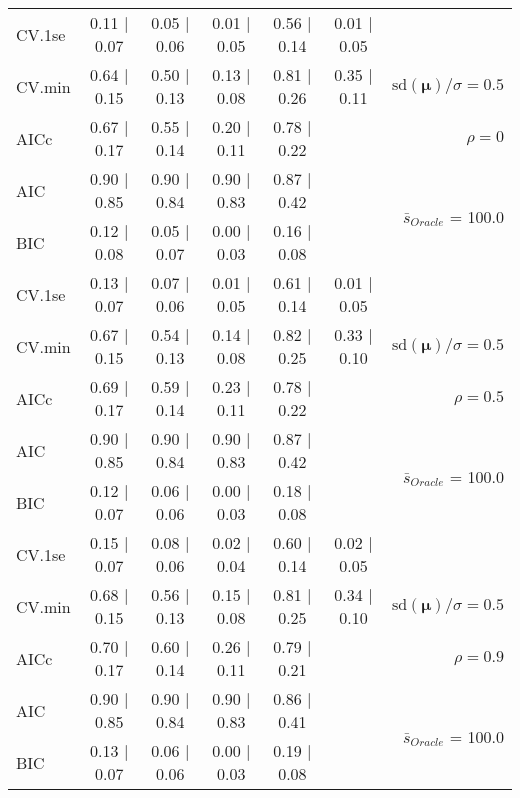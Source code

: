 \begin{table}
\begin{center}
\begin{tabular}{l*{5}{c}|r}
 \hline 
CV.1se & 0.11 $\mid$ 0.07 & 0.05 $\mid$ 0.06 & 0.01 $\mid$ 0.05 & 0.56 $\mid$ 0.14 & 0.01 $\mid$ 0.05 & \\
CV.min & 0.64 $\mid$ 0.15 & 0.50 $\mid$ 0.13 & 0.13 $\mid$ 0.08 & 0.81 $\mid$ 0.26 & 0.35 $\mid$ 0.11 &  $\mathrm{sd}(\mathbf{\mu})/\sigma=0.5$ \\
AICc & 0.67 $\mid$ 0.17 & 0.55 $\mid$ 0.14 & 0.20 $\mid$ 0.11 & 0.78 $\mid$ 0.22 & & $\rho=0$ \\
AIC & 0.90 $\mid$ 0.85 & 0.90 $\mid$ 0.84 & 0.90 $\mid$ 0.83 & 0.87 $\mid$ 0.42 & &  \multirow{2}{*}{$\bar{s}_{Oracle}$ = 100.0} \\
BIC & 0.12 $\mid$ 0.08 & 0.05 $\mid$ 0.07 & 0.00 $\mid$ 0.03 & 0.16 $\mid$ 0.08 & &  \\
 \hline 
CV.1se & 0.13 $\mid$ 0.07 & 0.07 $\mid$ 0.06 & 0.01 $\mid$ 0.05 & 0.61 $\mid$ 0.14 & 0.01 $\mid$ 0.05 & \\
CV.min & 0.67 $\mid$ 0.15 & 0.54 $\mid$ 0.13 & 0.14 $\mid$ 0.08 & 0.82 $\mid$ 0.25 & 0.33 $\mid$ 0.10 &  $\mathrm{sd}(\mathbf{\mu})/\sigma=0.5$ \\
AICc & 0.69 $\mid$ 0.17 & 0.59 $\mid$ 0.14 & 0.23 $\mid$ 0.11 & 0.78 $\mid$ 0.22 & & $\rho=0.5$ \\
AIC & 0.90 $\mid$ 0.85 & 0.90 $\mid$ 0.84 & 0.90 $\mid$ 0.83 & 0.87 $\mid$ 0.42 & &  \multirow{2}{*}{$\bar{s}_{Oracle}$ = 100.0} \\
BIC & 0.12 $\mid$ 0.07 & 0.06 $\mid$ 0.06 & 0.00 $\mid$ 0.03 & 0.18 $\mid$ 0.08 & &  \\
 \hline 
CV.1se & 0.15 $\mid$ 0.07 & 0.08 $\mid$ 0.06 & 0.02 $\mid$ 0.04 & 0.60 $\mid$ 0.14 & 0.02 $\mid$ 0.05 & \\
CV.min & 0.68 $\mid$ 0.15 & 0.56 $\mid$ 0.13 & 0.15 $\mid$ 0.08 & 0.81 $\mid$ 0.25 & 0.34 $\mid$ 0.10 &  $\mathrm{sd}(\mathbf{\mu})/\sigma=0.5$ \\
AICc & 0.70 $\mid$ 0.17 & 0.60 $\mid$ 0.14 & 0.26 $\mid$ 0.11 & 0.79 $\mid$ 0.21 & & $\rho=0.9$ \\
AIC & 0.90 $\mid$ 0.85 & 0.90 $\mid$ 0.84 & 0.90 $\mid$ 0.83 & 0.86 $\mid$ 0.41 & &  \multirow{2}{*}{$\bar{s}_{Oracle}$ = 100.0} \\
BIC & 0.13 $\mid$ 0.07 & 0.06 $\mid$ 0.06 & 0.00 $\mid$ 0.03 & 0.19 $\mid$ 0.08 & &  \\
 \hline 
\end{tabular}
\end{center}
\vspace{-1cm}
\end{table}




